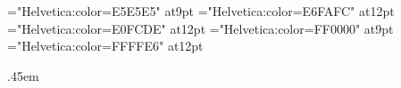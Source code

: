 \def\slnocdli{\vbox{\hbox to\cdliwd{\hfil}\vfil}}
\def\slnodist{\vbox{\hbox to1in{\hfil}\vfil}}
\def\slnoglyf{\vbox{\hbox to\slcwd{\hfil}\vfil}}

\def\tbodyrule{\noalign{\hrule\vskip3pt plus1pt minus1pt}\noalign{\allowbreak}}

\def\notcovrule{\noalign{\kern2pt\hrule height.2pt\vskip3pt plus1pt minus1pt}\noalign{\allowbreak}}

\def\tbodybreak{\noalign{\allowbreak}}

\def\sltabrule{\noalign{\hrule\vskip3pt plus1pt minus1pt}}


\font\hveee="Helvetica:color=E5E5E5" at9pt
\font\hveff="Helvetica:color=E6FAFC" at12pt
\font\hvefd="Helvetica:color=E0FCDE" at12pt
\font\hvfee="Helvetica:color=FF0000" at9pt
\font\hvffe="Helvetica:color=FFFFE6" at12pt

\def\not{\hveee}%
\def\sqchr{\hveff}%
\def\sqinv{\hvefd}%
\def\sqopq{\hvfee}%
\def\sqseq{\hvffe}%

\def\pcnot{\pceee}%
\def\pcsqchr{\pceff}%
\def\pcsqinv{\pcefd}%
\def\pcsqopq{\pcfee}%
\def\pcsqseq{\pcffe}%

\def\ucode#1{\Sans\eight\rm}

\def\tablerule{\noalign{\allowbreak\hrule}}

\def\cctnum#1{\vbox to1.5em{\hbox to\ccwd{\hfil\helv#1\hfil}\vfil}}
\def\cclnum#1{\llap{\vbox to\ccht{\vfil\hbox{\helv#1\kern5pt}\vfil}}}

\let\trhook\relax
\def\tvrule{\vrule}
\def\tvrulex{\vrule width1pt\relax}

\def\thead{\Sans\nine\rm}

\def\codechart{\def\thead{\Sans\nine\rm}%
}

\newbox\pcslbox \newbox\pcslheaderbox \newbox\pcslheadertmp
\newdimen\pcslrowht
\newdimen\pcslquad \pcslquad.45em
\newdimen\pcslquadb {}
\def\nquadb{\hskip1pt\relax}
\def\pquad{\hskip\pcslquad\relax}
\def\pquadb{\hskip\pcslquadb\relax}
\def\slcufont{\let\ucode\relax\helvz}
\def\slhbox#1{\hbox to\slcwd{\hfil#1\hfil}}

